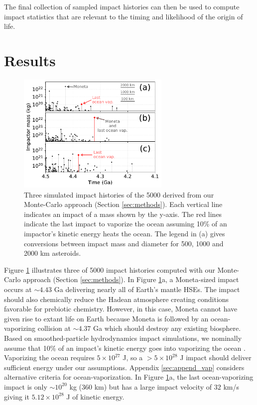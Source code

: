 \documentclass[manuscript]{aastex63}
\begin{document}
The final collection of sampled impact histories can then be used to compute impact statistics that are relevant to the timing and likelihood of the origin of life.

\section{Results} \label{sec:results}

\begin{figure}
  \centering
  \includegraphics[width=0.65\textwidth]{figures/example_impact_histories.pdf}
  \caption{Three simulated impact histories of the 5000 derived from our Monte-Carlo approach (Section \ref{sec:methods}). Each vertical line indicates an impact of a mass shown by the y-axis. The red lines indicate the last impact to vaporize the ocean assuming 10\% of an impactor's kinetic energy heats the ocean. The legend in (a) gives conversions between impact mass and diameter for 500, 1000 and 2000 km asteroids.}
  \label{fig:example_impact_histories}
\end{figure}

Figure \ref{fig:example_impact_histories} illustrates three of 5000 impact histories computed with our Monte-Carlo approach (Section \ref{sec:methods}). In Figure \ref{fig:example_impact_histories}a, a Moneta-sized impact occurs at $\sim 4.43$ Ga delivering nearly all of Earth's mantle HSEs. The impact should also chemically reduce the Hadean atmosphere creating conditions favorable for prebiotic chemistry. However, in this case, Moneta cannot have given rise to extant life on Earth because Moneta is followed by an ocean-vaporizing collision at $\sim 4.37$ Ga which should destroy any existing biosphere. Based on smoothed-particle hydrodynamics impact simulations, we nominally assume that 10\% of an impact's kinetic energy goes into vaporizing the ocean \citep[Appendix \ref{sec:append_vap},][]{Citron_2022}. Vaporizing the ocean requires $5 \times 10^{27}$ J, so a $> 5 \times 10^{28}$ J impact should deliver sufficient energy under our assumptions. Appendix \ref{sec:append_vap} considers alternative criteria for ocean-vaporization. In Figure \ref{fig:example_impact_histories}a, the last ocean-vaporizing impact is only $\sim 10^{20}$ kg (360 km) but has a large impact velocity of $32$ km/s giving it $5.12 \times 10^{28}$ J of kinetic energy. 
\end{document}
